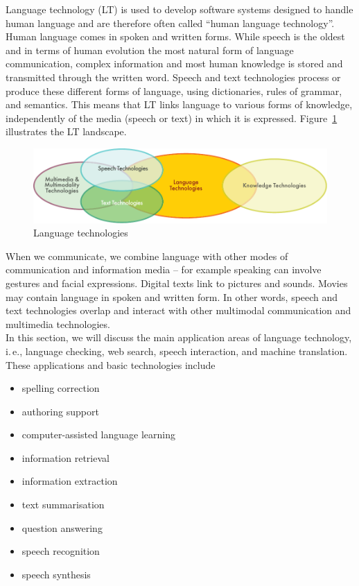 \begin{multicols}{2}

Language technology (LT) is used to develop software systems designed to handle human language and are therefore often called “human language technology”. Human language comes in spoken and written forms. While speech is the oldest and in terms of human evolution the most natural form of language communication, complex information and most human knowledge is stored and transmitted through the written word. Speech and text technologies process or produce these different forms of language, using dictionaries, rules of grammar, and semantics. This means that LT links language to various forms of knowledge, independently of the media (speech or text) in which it is expressed. Figure~\ref{fig:ltincontext_en} illustrates the LT landscape.

\begin{figure}[htb]
  \center
  \includegraphics[width=\textwidth]{../_media/english/language_technologies}
  \caption{Language technologies}
  \label{fig:ltincontext_en}
\end{figure}

When we communicate, we combine language with other modes of communication and information media – for example speaking can involve gestures and facial expressions. Digital texts link to pictures and sounds. Movies may contain language in spoken and written form. In other words, speech and text technologies overlap and interact with other multimodal communication and multimedia technologies.\\ 

In this section, we will discuss the main application areas of language technology, i.\,e., language checking, web search, speech interaction, and machine translation. These applications and basic technologies include 

\begin{itemize}
\item spelling correction
\item authoring support
\item computer-assisted language learning
\item information retrieval 
\item information extraction
\item text summarisation
\item question answering
\item speech recognition 
\item speech synthesis 
\end{itemize}


\end{multicols}

